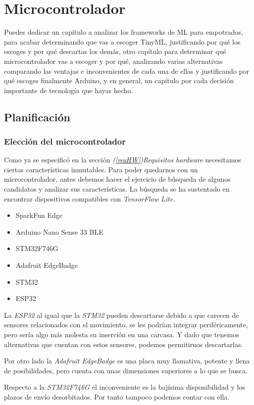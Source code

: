 \chapter{Microcontrolador}
{\color{red} Puedes dedicar un capítulo a
analizar los frameworks de ML para empotrados, para acabar
determinando que vas a escoger TinyML, justificando por qué los
escoges y por qué descartas los demás, otro capítulo para
determinar qué microcontrolador vas a escoger y por qué, analizando
varias alternativas comparando las ventajas e inconvenientes de cada
una de ellas y justificando por qué escoges finalmente Arduino, y en
general, un capítulo por cada decisión importante de tecnología que
hayas hecho.}
\section{Planificación}
\subsection{Elección del microcontrolador}
Como ya se especificó en la sección \textit{(\ref{reqHW})Requisitos hardware}
necesitamos ciertas características inmutables. Para poder quedarnos con un
microcontrolador, antes debemos hacer el ejercicio de búsqueda de algunos
candidatos y analizar sus características. La búsqueda se ha sustentado
en encontrar dispositivos compatibles con \textit{TensorFlow Lite}.
\begin{itemize}
    \itemsep0em 
    \item SparkFun Edge
    \item Arduino Nano Sense 33 BLE
    \item STM32F746G
    \item Adafruit EdgeBadge
    \item STM32
    \item ESP32
\end{itemize}
La \textit{ESP32} al igual que la \textit{STM32} pueden descartarse debido a que
carecen de sensores relacionados
con el movimiento, se les podrían integrar periféricamente, pero sería algo
más molesta su inserción en una carcasa. Y dado que tenemos alternativas que
cuentan con estos sensores, podemos permitirnos descartarlas.

Por otro lado la \textit{Adafruit EdgeBadge} es una placa muy llamativa,
potente y llena de posibilidades, pero cuenta con unas dimensiones superiores
a lo que se busca.

Respecto a la \textit{STM32F746G} el inconveniente es la bajísima disponibilidad
y los plazos de envío desorbitados. Por tanto tampoco podemos contar con ella.

